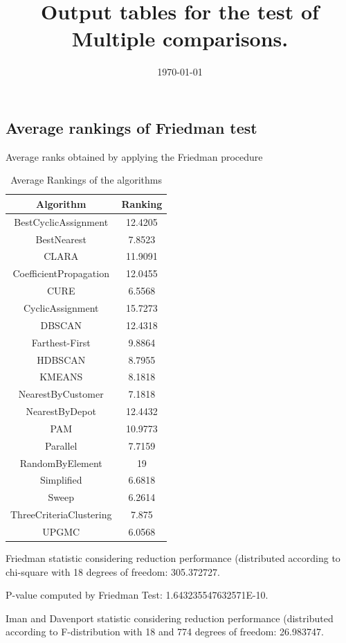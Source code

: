 \documentclass[a4paper,10pt]{article}
\title{Output tables for the test of Multiple comparisons.}
\author{}
\date{\today}
\begin{document}
\begin{landscape}
\pagestyle{empty}
\maketitle
\thispagestyle{empty}
\section{Average rankings of Friedman test}



Average ranks obtained by applying the Friedman procedure

\begin{table}[!htp]
\centering
\begin{tabular}{|c|c|}\hline
Algorithm&Ranking\\\hline
BestCyclicAssignment & 12.4205\\
BestNearest & 7.8523\\
CLARA & 11.9091\\
CoefficientPropagation & 12.0455\\
CURE & 6.5568\\
CyclicAssignment & 15.7273\\
DBSCAN & 12.4318\\
Farthest-First & 9.8864\\
HDBSCAN & 8.7955\\
KMEANS & 8.1818\\
NearestByCustomer & 7.1818\\
NearestByDepot & 12.4432\\
PAM & 10.9773\\
Parallel & 7.7159\\
RandomByElement & 19\\
Simplified & 6.6818\\
Sweep & 6.2614\\
ThreeCriteriaClustering & 7.875\\
UPGMC & 6.0568\\
\hline
\end{tabular}
\caption{Average Rankings of the algorithms}
\end{table}

Friedman statistic considering reduction performance (distributed according to chi-square with 18 degrees of freedom: 305.372727.

P-value computed by Friedman Test: 1.643235547632571E-10.\newline

Iman and Davenport statistic considering reduction performance (distributed according to F-distribution with 18 and 774 degrees of freedom: 26.983747.


\end{landscape}
\end{document}
